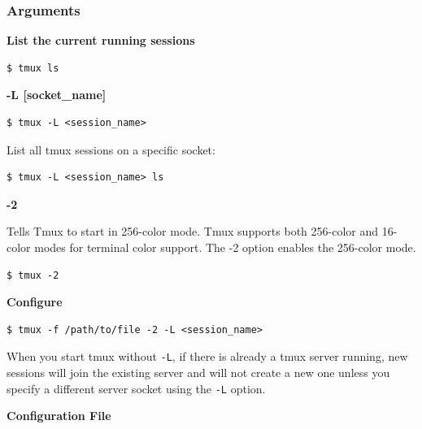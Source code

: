 \documentclass{article}
\newenvironment{blocktemplateIII}[1]{%
    \tcolorbox[beamer,%
    noparskip,breakable,
    ,colframe=Red,%
    colbacklower=LimeGreen!75!LightGreen,%
    title=#1]}%
    {\endtcolorbox}
\newenvironment{codetemplate}[1][]{%
  \mybasecolorbox[#1]
  \itshape
}{%
  \endmybasecolorbox
}
\begin{document}
\subsubsection{Arguments}

\textbf{List the current running sessions}
\begin{codetemplate}
\begin{verbatim}
$ tmux ls
\end{verbatim}
\end{codetemplate}

\textbf{-L [socket\_name]}

\begin{codetemplate}
\begin{verbatim}
$ tmux -L <session_name>
\end{verbatim}
\end{codetemplate}

List all tmux sessions on a specific socket:
\begin{codetemplate}
\begin{verbatim}
$ tmux -L <session_name> ls
\end{verbatim}
\end{codetemplate}

\textbf{-2}

Tells Tmux to start in 256-color mode. Tmux supports both 256-color and 16-color modes for terminal color support. The -2 option enables the 256-color mode.

\begin{codetemplate}
\begin{verbatim}
$ tmux -2
\end{verbatim}
\end{codetemplate}

\textbf{Configure}
\begin{codetemplate}
\begin{verbatim}
$ tmux -f /path/to/file -2 -L <session_name>
\end{verbatim}
\end{codetemplate}

\begin{blocktemplateIII}{Warning}
When you start tmux without \verb|-L|, if there is already a tmux server running, new sessions will join the existing server and will not create a new one unless you specify a different server socket using the \verb|-L| option.
\end{blocktemplateIII}

\textbf{Configuration File}
\end{document}

